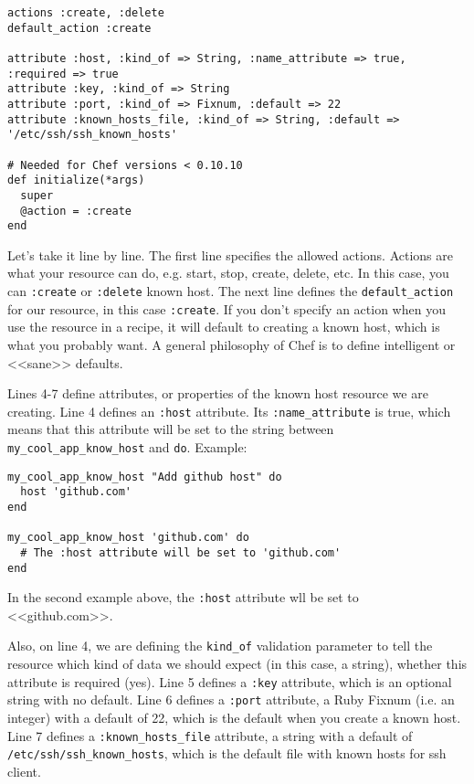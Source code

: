 \begin{lstlisting}[label=lst:cookbook-lwrp1,title=my-server-cloud/site-cookbooks/my\_cool\_app/resources/know\_host.rb]
actions :create, :delete
default_action :create

attribute :host, :kind_of => String, :name_attribute => true, :required => true
attribute :key, :kind_of => String
attribute :port, :kind_of => Fixnum, :default => 22
attribute :known_hosts_file, :kind_of => String, :default => '/etc/ssh/ssh_known_hosts'

# Needed for Chef versions < 0.10.10
def initialize(*args)
  super
  @action = :create
end
\end{lstlisting}

Let's take it line by line. The first line specifies the allowed actions. Actions are what your resource can do, e.g. start, stop, create, delete, etc. In this case, you can \lstinline!:create! or \lstinline!:delete! known host. The next line defines the \lstinline!default_action! for our resource, in this case \lstinline!:create!. If you don't specify an action when you use the resource in a recipe, it will default to creating a known host, which is what you probably want. A general philosophy of Chef is to define intelligent or <<sane>> defaults.

Lines 4-7 define attributes, or properties of the known host resource we are creating. Line 4 defines an \lstinline!:host! attribute. Its \lstinline!:name_attribute! is true, which means that this attribute will be set to the string between \lstinline!my_cool_app_know_host! and \lstinline!do!. Example:

\begin{lstlisting}[label=lst:cookbook-lwrp2]
my_cool_app_know_host "Add github host" do
  host 'github.com'
end

my_cool_app_know_host 'github.com' do
  # The :host attribute will be set to 'github.com'
end
\end{lstlisting}

In the second example above, the \lstinline!:host! attribute wll be set to <<github.com>>.

Also, on line 4, we are defining the \lstinline!kind_of! validation parameter to tell the resource which kind of data we should expect (in this case, a string), whether this attribute is required (yes). Line 5 defines a \lstinline!:key! attribute, which is an optional string with no default. Line 6 defines a \lstinline!:port! attribute, a Ruby Fixnum (i.e. an integer) with a default of 22, which is the default when you create a known host. Line 7 defines a \lstinline!:known_hosts_file! attribute, a string with a default of \lstinline!/etc/ssh/ssh_known_hosts!, which is the default file with known hosts for ssh client.

